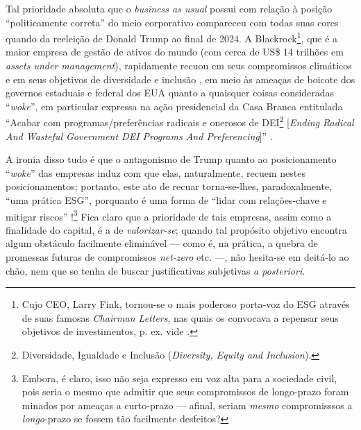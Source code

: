 \documentclass[12pt]{article}
\numberwithin{equation}{section}
\theoremstyle{plain}
\theoremstyle{definition}
\theoremstyle{remark}
\begin{document}
Tal prioridade absoluta que o \textit{business as usual} possui com relação à posição ``politicamente correta'' do meio corporativo compareceu com todas suas cores quando da reeleição de Donald Trump ao final de 2024. A Blackrock\footnote{Cujo CEO, Larry Fink, tornou-se o mais poderoso porta-voz do ESG através de suas famosas \textit{Chairman Letters}, nas quais os convocava a repensar seus objetivos de investimentos, p. ex. vide \textcite{Fink2020,Fink2021,Fink2022}.}, que é a maior empresa de gestão de ativos do mundo (com cerca de US\$ 14 trilhões em \textit{assets under management}), rapidamente recuou em seus compromissos climáticos \parencite{Brush2025,Mirza2025} e em seus objetivos de diversidade e inclusão \parencite{Johnson2025a}, em meio às ameaças de boicote dos governos estaduais e federal dos EUA quanto a quaisquer coisas consideradas ``\textit{woke}'', em particular expressa na ação presidencial da Casa Branca entitulada ``Acabar com programas/preferências radicais e onerosos de DEI\footnote{Diversidade, Igualdade e Inclusão (\textit{Diversity, Equity and Inclusion}).} [\textit{Ending Radical And Wasteful Government DEI Programs And Preferencing}]'' \cite{WhiteHouse2025}.

A ironia disso tudo é que o antagonismo de Trump quanto ao posicionamento ``\textit{woke}'' das empresas induz com que elas, naturalmente, recuem nestes posicionamentos; portanto, este ato de recuar torna-se-lhes, paradoxalmente, ``uma prática ESG'', porquanto é uma forma de ``lidar com relações-chave e mitigar riscos'' \parencite[p. 23]{Pollman2022}!\footnote{Embora, é claro, isso não seja expresso em voz alta para a sociedade civil, pois seria o mesmo que admitir que seus compromissos de longo-prazo foram minados por ameaças a curto-prazo --- afinal, seriam \textit{mesmo} compromisssos a \textit{longo}-prazo se fossem tão facilmente desfeitos?} Fica claro que a prioridade de tais empresas, assim como a finalidade do capital, é a de \textit{valorizar-se}; quando tal propósito objetivo encontra algum obstáculo facilmente eliminável --- como é, na prática, a quebra de promessas futuras de compromissos \textit{net-zero} etc. ---, não hesita-se em deitá-lo ao chão, nem que se tenha de buscar justificativas subjetivas \textit{a posteriori}. 

\end{document}
